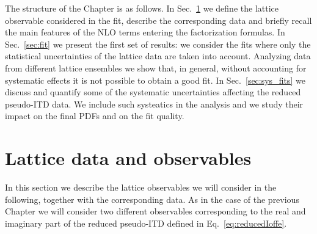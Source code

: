 \iffalse
In this article we extend the general strategy that has been developed within the {\tt NNPDF} framework and which allows us to systematically extract parton distributions from the available lattice data. In the implementation of this idea once the lattice data have reached some level of maturity in terms of precision and systematic effects, one could combine data from all pertinent lattice formalisms such as quasi-distributions ~\cite{Lin:2014zya,Chen:2016utp,Alexandrou:2015rja,Alexandrou:2016jqi, Monahan:2016bvm, Zhang:2017bzy, Alexandrou:2017huk, Green:2017xeu,Alexandrou:2018pbm,Chen:2018xof,Alexandrou:2018eet,Lin:2018qky,Fan:2018dxu,Liu:2018hxv,Alexandrou:2019lfo,Izubuchi:2019lyk,Green:2020xco,Chai:2020nxw,Lin:2020ssv,Alexandrou:2020zbe}
and pseudo-distributions ~\cite{Orginos:2017kos,Karpie:2018zaz,Joo:2019jct,Joo:2019bzr,Joo:2020spy,Bhat:2020ktg,Fan:2020cpa,Gao:2020ito}.
One can also include results from the so-called ``Good Lattice Cross-Sections'' (LCS) approach,
which is described in~\cite{Ma:2017pxb} and represents a general framework, where one computes matrix elements that can be factorized into PDFs at short distances. 
Papers~\cite{Bali:2017gfr,Bali:2018spj,Sufian:2019bol,Bali:2019ecy, Sufian:2020vzb} describe implementations of the latter formalism.
Clearly a global analysis only makes sense after having scrutinised each set of data individually,
and having understood the systematics that affect them.
\fi
The structure of the Chapter is as  follows.  In Sec.~\ref{sec:data} we define the lattice observable considered in the fit,
describe the corresponding data and  briefly recall the main features of the NLO terms entering the factorization formulas.
In Sec.~\ref{sec:fit} we present the first set of results:
we consider the  fits where only the statistical uncertainties of the lattice data are taken into account.
Analyzing data from different lattice ensembles we 
show that, in general, without accounting for systematic effects  it is not possible to obtain a good fit.
In Sec.~\ref{sec:sys_fits} we discuss and quantify some of the systematic uncertainties affecting
the reduced pseudo-ITD data.  We include such systeatics in the analysis and we study their impact on the final PDFs
and on the fit quality.


\section{Lattice data and observables}
\label{sec:data}

In this section we describe the lattice observables we will consider in the following, together with the corresponding data.
As in the case of the previous Chapter we will consider two different observables corresponding to 
the real and imaginary part of the reduced pseudo-ITD defined in Eq.~\eqref{eq:reducedIoffe}.
 
